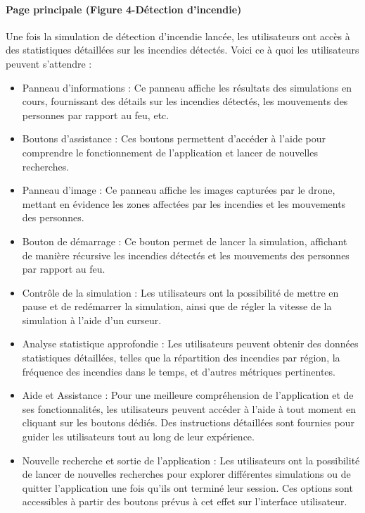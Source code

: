 \paragraph{Page principale (Figure 4-Détection d'incendie)}Une fois la simulation de détection d'incendie lancée, les utilisateurs ont accès à des statistiques détaillées sur les incendies détectés. Voici ce à quoi les utilisateurs peuvent s'attendre :
\begin{itemize}
    \item Panneau d'informations : Ce panneau affiche les résultats des simulations en cours, fournissant des détails sur les incendies détectés, les mouvements des personnes par rapport au feu, etc.
    \item Boutons d'assistance : Ces boutons permettent d'accéder à l'aide pour comprendre le fonctionnement de l'application et lancer de nouvelles recherches.
    \item Panneau d'image : Ce panneau affiche les images capturées par le drone, mettant en évidence les zones affectées par les incendies et les mouvements des personnes.
    \item Bouton de démarrage : Ce bouton permet de lancer la simulation, affichant de manière récursive les incendies détectés et les mouvements des personnes par rapport au feu.
    \item  Contrôle de la simulation : Les utilisateurs ont la possibilité de mettre en pause et de redémarrer la simulation, ainsi que de régler la vitesse de la simulation à l'aide d'un curseur.
    \item Analyse statistique approfondie :
Les utilisateurs peuvent obtenir des données statistiques détaillées, telles que la répartition des incendies par région, la fréquence des incendies dans le temps, et d'autres métriques pertinentes.
\item Aide et Assistance : 
Pour une meilleure compréhension de l'application et de ses fonctionnalités, les utilisateurs peuvent accéder à l'aide à tout moment en cliquant sur les boutons dédiés. Des instructions détaillées sont fournies pour guider les utilisateurs tout au long de leur expérience.
\item Nouvelle recherche et sortie de l'application :
Les utilisateurs ont la possibilité de lancer de nouvelles recherches pour explorer différentes simulations ou de quitter l'application une fois qu'ils ont terminé leur session. Ces options sont accessibles à partir des boutons prévus à cet effet sur l'interface utilisateur.
\end{itemize}


